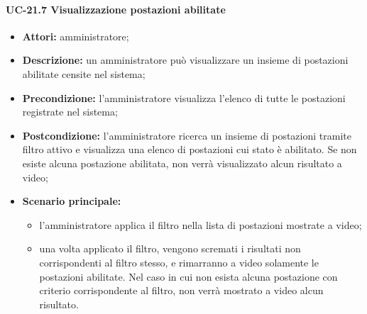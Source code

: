 \paragraph{UC-21.7 Visualizzazione postazioni abilitate}
\begin{itemize}
    \item \textbf{Attori:} amministratore;
    \item \textbf{Descrizione:} un amministratore pu\`{o} visualizzare un insieme di postazioni abilitate censite nel sistema;
    \item \textbf{Precondizione:} l'amministratore visualizza l'elenco di tutte le postazioni registrate nel sistema;
    \item \textbf{Postcondizione:} l'amministratore ricerca un insieme di postazioni tramite filtro attivo e visualizza una elenco di postazioni cui stato è abilitato. Se non esiste alcuna postazione abilitata, non verrà visualizzato alcun risultato a video;
    \item \textbf{Scenario principale:}
    \begin{itemize}
        \item l'amministratore applica il filtro nella lista di postazioni mostrate a video;
        \item una volta applicato il filtro, vengono scremati i risultati non corrispondenti al filtro stesso, e rimarranno a video solamente le postazioni abilitate. Nel caso in cui non esista alcuna postazione con criterio corrispondente al filtro, non verrà mostrato a video alcun risultato.
    \end{itemize}
\end{itemize}


